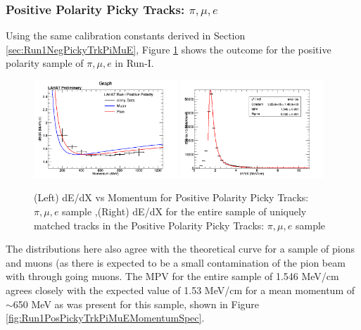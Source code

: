 \subsubsection{Positive Polarity Picky Tracks: $\pi, \mu, e$}\label{sec:Run1PosPickyTrkPiMuE}
\newpage

Using the same calibration constants derived in Section \ref{sec:Run1NegPickyTrkPiMuE}, Figure \ref{fig:Run1PosPickyTrkPiMuEResults} shows the outcome for the positive polarity sample of $\pi, \mu, e$ in Run-I.

\begin{figure}[htb]
\centering
\includegraphics[width=0.48\textwidth]{images/dEdXvsMomentumPosPolRun1FineBin.png}
\includegraphics[width=0.48\textwidth]{images/dEdXPosPolRun1.png}
\caption{(Left) dE/dX vs Momentum for Positive Polarity Picky Tracks: $\pi, \mu, e$ sample ,(Right) dE/dX for the entire sample of uniquely matched tracks in the Positive Polarity Picky Tracks: $\pi, \mu, e$ sample }
\label{fig:Run1PosPickyTrkPiMuEResults}
\end{figure}

The distributions here also agree with the theoretical curve for a sample of pions and muons (as there is expected to be a small contamination of the pion beam with through going muons. The MPV for the entire sample of 1.546 MeV/cm agrees closely with the expected value of 1.53 MeV/cm for a mean momentum of $\sim$650 MeV as was present for this sample, shown in Figure \ref{fig:Run1PosPickyTrkPiMuEMomentumSpec}.

